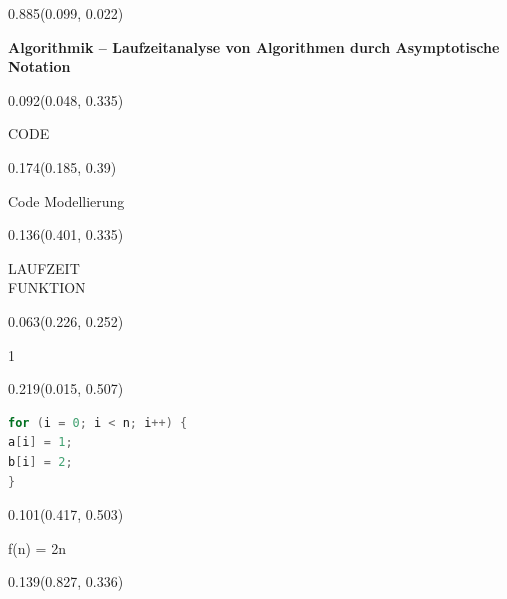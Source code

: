\documentclass[aspectratio=169]{beamer}
\begin{document}
\begin{frame}[fragile]
\begin{textblock}{0.885}(0.099, 0.022)
  \begin{minipage}[b][0.031\paperheight]{\linewidth}
    \raggedright
    \fontsize{3}{3.3}\selectfont \textbf{Algorithmik – Laufzeitanalyse von Algorithmen durch Asymptotische Notation}
  \end{minipage}
\end{textblock}
\begin{textblock}{0.092}(0.048, 0.335)
  \begin{minipage}[t][0.161\paperheight]{\linewidth}
    {\tiny CODE}
  \end{minipage}
\end{textblock}
\begin{textblock}{0.174}(0.185, 0.39)
  \begin{minipage}[t][0.054\paperheight]{\linewidth}
    {\tiny Code Modellierung}
  \end{minipage}
\end{textblock}
\begin{textblock}{0.136}(0.401, 0.335)
  \begin{minipage}[t][0.161\paperheight]{\linewidth}
    {\tiny LAUFZEIT\\FUNKTION}
  \end{minipage}
\end{textblock}
\begin{textblock}{0.063}(0.226, 0.252)
  \begin{minipage}[t][0.111\paperheight]{\linewidth}
    {\tiny 1}
  \end{minipage}
\end{textblock}
\begin{textblock}{0.219}(0.015, 0.507)
  \begin{minipage}[t][0.139\paperheight]{\linewidth}
    \begin{lstlisting}[language=Java, basicstyle=\ttfamily\scriptsize]
for (i = 0; i < n; i++) {
a[i] = 1;
b[i] = 2;
}
    \end{lstlisting}
  \end{minipage}
\end{textblock}
\begin{textblock}{0.101}(0.417, 0.503)
  \begin{minipage}[t][0.058\paperheight]{\linewidth}
    {\tiny f(n) = 2n}
  \end{minipage}
\end{textblock}
\begin{textblock}{0.139}(0.827, 0.336)

\end{textblock}
\end{frame}
\end{document}
